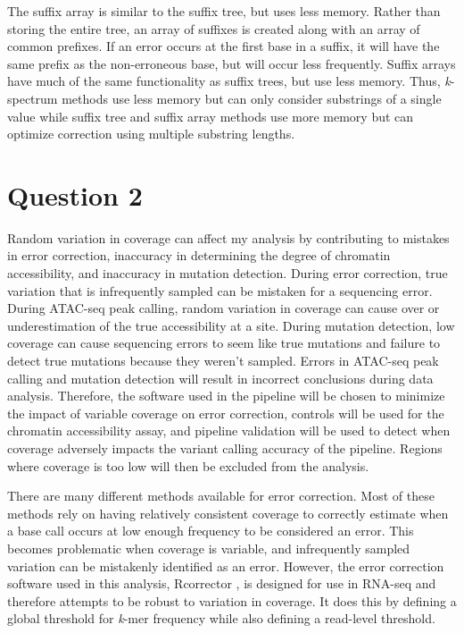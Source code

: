 The suffix array is similar to the suffix tree, but uses less memory. Rather than storing the entire tree, an array of suffixes is created along with an array of common prefixes. If an error occurs at the first base in a suffix, it will have the same prefix as the non-erroneous base, but will occur less frequently. Suffix arrays have much of the same functionality as suffix trees, but use less memory.
Thus, \textit{k}-spectrum methods use less memory but can only consider substrings of a single value while suffix tree and suffix array methods use more memory but can optimize correction using multiple substring lengths.

\section{Question 2}
Random variation in coverage can affect my analysis by contributing to mistakes in error correction, inaccuracy in determining the degree of chromatin accessibility, and inaccuracy in mutation detection. During error correction, true variation that is infrequently sampled can be mistaken for a sequencing error. During ATAC-seq peak calling, random variation in coverage can cause over or underestimation of the true accessibility at a site. During mutation detection, low coverage can cause sequencing errors to seem like true mutations and failure to detect true mutations because they weren't sampled. Errors in ATAC-seq peak calling and mutation detection will result in incorrect conclusions during data analysis. Therefore, the software used in the pipeline will be chosen to minimize the impact of variable coverage on error correction, controls will be used for the chromatin accessibility assay, and pipeline validation will be used to detect when coverage adversely impacts the variant calling accuracy of the pipeline. Regions where coverage is too low will then be excluded from the analysis.

There are many different methods available for error correction. Most of these methods rely on having relatively consistent coverage to correctly estimate when a base call occurs at low enough frequency to be considered an error. This becomes problematic when coverage is variable, and infrequently sampled variation can be mistakenly identified as an error. However, the error correction software used in this analysis, Rcorrector \parencite{song_rcorrector:_2015}, is designed for use in RNA-seq and therefore attempts to be robust to variation in coverage.
It does this by defining a global threshold for \textit{k}-mer frequency while also defining a read-level threshold.

